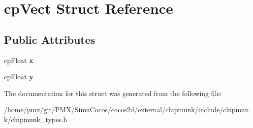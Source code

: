 \hypertarget{structcpVect}{}\section{cp\+Vect Struct Reference}
\label{structcpVect}
\subsection*{Public Attributes}
\begin{DoxyCompactItemize}
\item 
\mbox{\label{structcpVect_a16371845f9474f321d137615edfc16ad}} 
cp\+Float {\bfseries x}
\item 
\mbox{\label{structcpVect_afe915cf8f8e2694cdad97f0ce33bd4fd}} 
cp\+Float {\bfseries y}
\end{DoxyCompactItemize}


The documentation for this struct was generated from the following file\+:\begin{DoxyCompactItemize}
\item 
/home/pmx/git/\+P\+M\+X/\+Simu\+Cocos/cocos2d/external/chipmunk/include/chipmunk/chipmunk\+\_\+types.\+h\end{DoxyCompactItemize}
